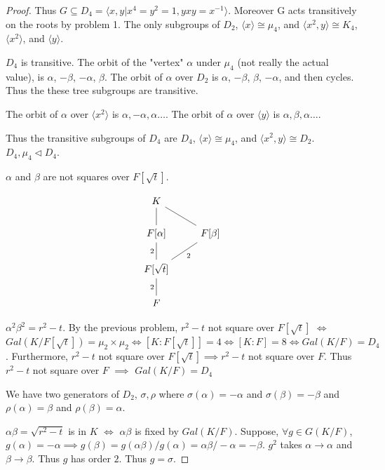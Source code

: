 \documentclass{article}
\newcommand{\angles}[1]{\langle #1 \rangle}
\begin{document}
\begin{proof}
    Thus $G \subseteq D_4 = \angles{x, y | x^4 = y^2 = 1, yxy = x^{-1}}$. Moreover G acts transitively on the roots by problem 1. The only subgroups of $D_2$, $\angles{x} \cong \mu_4$, and $\angles{x^2, y} \cong K_4$, $\angles{x^2}$, and $\angles{y}$.
    
    $D_4$ is transitive. The orbit of the "vertex" $\alpha$ under $\mu_4$ (not really the actual value), is $\alpha$, $-\beta$, $-\alpha$, $\beta$. The orbit of $\alpha$ over $D_2$ is $\alpha$, $-\beta$, $\beta$, $-\alpha$, and then cycles. Thus the these tree subgroups are transitive. 
    
    The orbit of $\alpha$ over $\angles{x^2}$ is $\alpha, -\alpha, \alpha \dots$. The orbit of $\alpha$ over $\angles{y}$ is $\alpha, \beta, \alpha \dots$.
    
    Thus the transitive subgroups of $D_4$ are $D_4$, $\angles{x} \cong \mu_4$, and $\angles{x^2, y} \cong D_2$. $D_4, \mu_4 \triangleleft D_4$.
    

    $\alpha$ and $\beta$ are not squares over $F[\sqrt{t}]$. 
    
    \[\begin{tikzcd}
        {K} \\
        {F[\alpha]} & {F[\beta]} \\
        {F[\sqrt{t}]} \\
        F
        \arrow[no head, from=2-1, to=1-1]
        \arrow[no head, from=2-2, to=1-1]
        \arrow["2", no head, from=3-1, to=2-1]
        \arrow["2"', no head, from=3-1, to=2-2]
        \arrow["2", no head, from=4-1, to=3-1]
    \end{tikzcd}\]

    $\alpha^2 \beta^2 = r^2 - t$. By the previous problem, $r^2 - t$ not square over $F[\sqrt{t}]$ $\iff$ $Gal(K / F[\sqrt{t}]) = \mu_2 \times \mu_2 \iff [K : F[\sqrt{t}]] = 4 \iff [K : F] = 8 \iff Gal(K / F) = D_4$. Furthermore, $r^2 - t$ not square over $F[\sqrt{t}] \implies r^2 - t$ not square over $F$. Thus $r^2 - t$ not square over $F$ $\implies$ $Gal(K / F) = D_4$  
    
    We have two generators of $D_2$, $\sigma, \rho$ where $\sigma(\alpha) = -\alpha$ and $\sigma(\beta) = -\beta$ and $\rho(\alpha) = \beta$ and $\rho(\beta) = \alpha$. 
    
    $\alpha \beta = \sqrt{r^2 - t}$ is in $K$ $\iff$ $\alpha \beta$ is fixed by $Gal(K / F)$. Suppose, $\forall g \in G(K / F)$, $g(\alpha) = -\alpha \implies g(\beta) = g(\alpha \beta) / g(\alpha) = \alpha \beta / -\alpha = -\beta$. $g^2$ takes $\alpha \to \alpha$ and $\beta \to \beta$. Thus $g$ has order $2$. Thus $g = \sigma$.
    

\end{proof}
\end{document}
